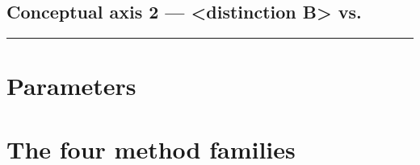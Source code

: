 \documentclass[12pt,a4paper]{article}
\begin{document}
\subsection{\texorpdfstring{Conceptual axis 2 --- <distinction B> vs.\ <distinction C>}{Conceptual axis 2 -- <distinction B> vs. <distinction C>}}
\label{sec:conceptual-axis-2}
%

\noindent\rule{\textwidth}{0.4pt}
\FloatBarrier

\section{Parameters}
\label{sec:configuration}
%

\section{The four method families}
\label{sec:the-four-method-families}
\end{document}
